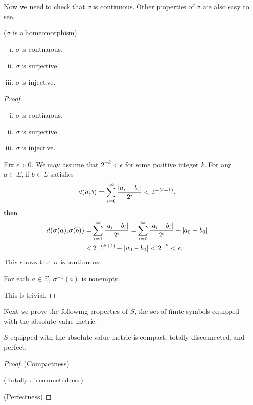 \documentclass[10pt,twoside]{book}
\begin{document}
Now we need to check that $\sigma$ is continuous.
Other properties of $\sigma$ are also easy to see.
\begin{proposition}
  ($\sigma$ is a homeomorphism)
  \begin{enumerate}[(i)]
    \item $\sigma$ is continuous.
    \item  $\sigma$ is surjective.
    \item  $\sigma$ is injective.
  \end{enumerate}
  \begin{proof}
    \begin{enumerate}[(i)]
      \item $\sigma$ is continuous.
      \item  $\sigma$ is surjective.
      \item  $\sigma$ is injective.
    \end{enumerate}
  \item
    Fix $\epsilon > 0$.
    We may assume that $2^{-k} < \epsilon$ for some positive integer $k$.
    For any $a \in \Sigma$, if $b \in \Sigma$ satisfies
    \begin{equation*}
      d(a,b) = \sum\limits_{i=0}^{\infty} \frac{\left | a_i - b_i \right |}{2^i} < 2^{-(k+1)},
    \end{equation*}
    then 
    \begin{align*}
      d(\sigma(a), \sigma(b)) 
      &= \sum\limits_{i=1}^{\infty} \frac{\left | a_i - b_i \right |}{2^i} 
      = \sum\limits_{i=0}^{\infty} \frac{\left | a_i - b_i \right |}{2^i} - \left | a_0 - b_0 \right |  \\
      &< 2^{-(k+1)} - \left | a_0 - b_0 \right |
      < 2^{-k}
      < \epsilon.
    \end{align*}
    This shows that $\sigma$ is continuous.
  \item
    For each $a \in \Sigma$, $\sigma^{-1}(a)$ is nonempty.
  \item
    This is trivial.
  \end{proof}
  \label{prop:symb-sigma-cont}
\end{proposition}
Next we prove the following properties of $S$, the set of finite symbols equipped with the absolute value metric.
\begin{proposition}
  $S$ equipped with the absolute value metric is compact, totally disconnected, and perfect.
  \begin{proof}
    (Compactness)

    (Totally disconnectedness)

    (Perfectness)

  \end{proof}
\end{proposition}
\end{document}
